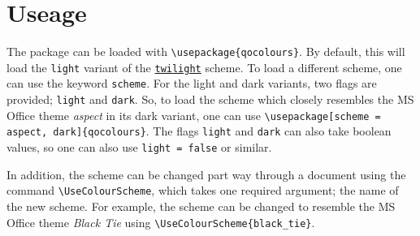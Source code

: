 \documentclass[]{article}
\begin{document}
  \section{Useage}

  The package can be loaded with \verb|\usepackage{qocolours}|. By default, this will load the \texttt{light} variant of the \hyperref[section:default]{\texttt{twilight}} scheme. To load a different scheme, one can use the keyword \texttt{scheme}. For the light and dark variants, two flags are provided; \texttt{light} and \texttt{dark}. So, to load the scheme which closely resembles the MS Office theme \textit{aspect} in its dark variant, one can use \verb|\usepackage[scheme = aspect, dark]{qocolours}|. The flags \texttt{light} and \texttt{dark} can also take boolean values, so one can also use \verb|light = false| or similar.

  In addition, the scheme can be changed part way through a document using the command \verb|\UseColourScheme|, which takes one required argument; the name of the new scheme. For example, the scheme can be changed to resemble the MS Office theme \textit{Black Tie} using \verb|\UseColourScheme{black_tie}|.
\end{document}
